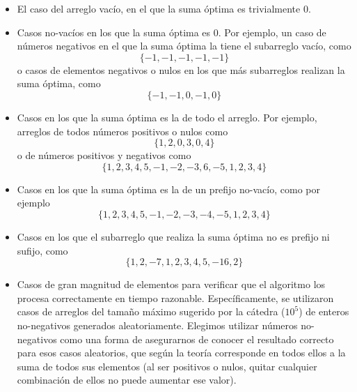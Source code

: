 \begin{itemize}
    \item El caso del arreglo vacío, en el que la suma óptima es trivialmente $0$.
    \item Casos no-vacíos en los que la suma óptima es $0$. Por ejemplo, un caso de números negativos en el que la suma óptima la tiene el subarreglo vacío, como
    \[
        \{-1,-1,-1,-1,-1\}
    \]
    o casos de elementos negativos o nulos en los que más subarreglos realizan la suma óptima, como
    \[
        \{-1,-1,0,-1,0\}
    \]
    \item Casos en los que la suma óptima es la de todo el arreglo. Por ejemplo, arreglos de todos números positivos o nulos como
    \[
        \{1,2,0,3,0,4\}
    \]
    o de números positivos y negativos como
    \[
        \{1,2,3,4,5,-1,-2,-3,6,-5,1,2,3,4\}
    \]
    \item Casos en los que la suma óptima es la de un prefijo no-vacío, como por ejemplo
    \[
        \{1,2,3,4,5,-1,-2,-3,-4,-5,1,2,3,4\}
    \]
    \item Casos en los que el subarreglo que realiza la suma óptima no es prefijo ni sufijo, como
    \[
        \{1,2,-7,1,2,3,4,5,-16,2\}
    \]
    \item Casos de gran magnitud de elementos para verificar que el algoritmo los procesa correctamente en tiempo razonable. Específicamente, se utilizaron casos de arreglos del tamaño máximo sugerido por la cátedra ($10^5$) de enteros no-negativos generados aleatoriamente. Elegimos utilizar números no-negativos como una forma de asegurarnos de conocer el resultado correcto para esos casos aleatorios, que según la teoría corresponde en todos ellos a la suma de todos sus elementos (al ser positivos o nulos, quitar cualquier combinación de ellos no puede aumentar ese valor).

\end{itemize}
